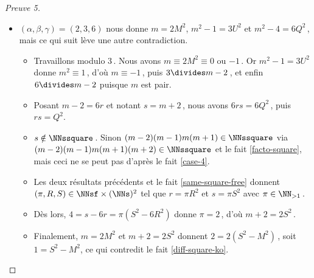 \begin{proof}[Preuve 5]
\begin{itemize}
		\item $(\alpha, \beta, \gamma) = (2, 3, 6)$ nous donne $m = 2 M^2$, $m^2 - 1 = 3 U^2$ et $m^2 - 4 = 6 Q^2$\,, mais ce qui suit lève une autre contradiction.
		\begin{itemize}
			\item Travaillons modulo $3$\,.
			Nous avons $m \equiv 2 M^2 \equiv \text{$0$ ou $-1$}$\,. 
			Or $m^2 - 1 = 3 U^2$ donne $m^2 \equiv 1$\,, d'où $m \equiv -1$\,, puis $3 \divides m - 2$\,, et enfin $6 \divides m - 2$ puisque $m$ est pair.
			
			\item Posant $m - 2 = 6 r$ et notant $s = m + 2$\,, nous avons $6 r s = 6 Q^2$\,, puis $r s = Q^2$.
			
			\item $s \notin \NNssquare$\,. Sinon $(m-2)(m-1)m(m+1) \in \NNssquare$ via $(m-2)(m-1)m(m+1)(m+2)  \in \NNssquare$ et le fait \ref{facto-square}, mais ceci ne se peut pas d'après le fait \ref{case-4}.
			
			\item Les deux résultats précédents et le fait \ref{same-square-free} donnent $(\pi, R, S) \in \NNsf \times ( \NNs )^2$ tel que $r = \pi R^2$ et $s = \pi S^2$ avec  $\pi \in \NN_{>1}$\,.
			
			\item Dès lors, $4 = s - 6r = \pi (S^2 - 6 R^2)$ donne $\pi = 2$\,, d'où $m + 2 = 2 S^2$\,.
			
			\item Finalement, $m = 2 M^2$ et $m + 2 = 2 S^2$ donnent $2 = 2(S^2 - M^2)$\,, soit $1 = S^2 - M^2$, ce qui contredit le fait \ref{diff-square-ko}.
			\qedhere
		\end{itemize}
	\end{itemize}
\end{proof}


